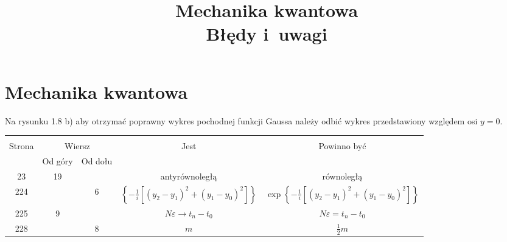\documentclass[a4paper,11pt]{article}
\title{Mechanika kwantowa \\
  Błędy i~uwagi}
\begin{document}





\maketitle %





\section{Mechanika kwantowa}

\vspace{\spaceTwo}







\start {} Na rysunku 1.8 b) aby otrzymać poprawny wykres
pochodnej funkcji Gaussa należy odbić wykres przedstawiony względem osi
$y = 0$.

\vspace{\spaceFour}







\begin{center}

  \begin{tabular}{|c|c|c|c|c|}
    \hline
    & \multicolumn{2}{c|}{} & & \\
    Strona & \multicolumn{2}{c|}{Wiersz} & Jest
                              & Powinno być \\ \cline{2-3}
    & Od góry & Od dołu & & \\
    \hline
    23 & 19 & & antyrównoległą & równoległą \\
    224 & & 6 & $\left\{ -\frac{ 1 }{ i } [ ( y_{ 2  } - y_{ 1 } )^{ 2 }
                + ( y_{ 1 } - y_{ 0 } )^{ 2 } ] \right\}$
           & $\exp\left\{ -\frac{ 1 }{ i } [ ( y_{ 2  } - y_{ 1 } )^{ 2 }
             + ( y_{ 1 } - y_{ 0 } )^{ 2 } ] \right\}$ \\
    225 & 9 & & $N \varepsilon \to t_{ n } - t_{ 0 }$
           & $N \varepsilon = t_{ n } - t_{ 0 }$ \\
    228 & & 8 & $m$ & $\frac{ 1 }{ 2 } m$ \\
    \hline
  \end{tabular}

\end{center}
\end{document}
